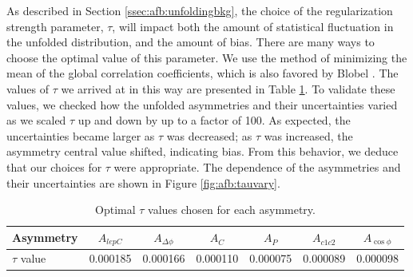 As described in Section \ref{ssec:afb:unfoldingbkg}, the choice of the
regularization strength parameter, $\tau$, will impact both the amount of statistical
fluctuation in the unfolded distribution, and the amount of
bias. There are many ways to choose the optimal value of this parameter. We
use the method of minimizing the mean of the global correlation
coefficients, which is also favored by Blobel
\cite{blobelseminar}. The values of $\tau$ we arrived at in this way
are presented in Table \ref{tab:afb:tau1d}. To validate these values,
we checked how the unfolded asymmetries and their uncertainties varied as we scaled
$\tau$ up and down by up to a factor of 100. As expected, the
uncertainties became larger as $\tau$ was decreased; as $\tau$ was
increased, the asymmetry central value shifted, indicating bias. From
this behavior, we deduce that our choices for $\tau$ were
appropriate. The dependence of the asymmetries and their uncertainties
are shown in Figure \ref{fig:afb:tauvary}.

\begin{table}[htb]
\begin{center}
\caption{Optimal $\tau$ values chosen for each asymmetry.}
\label{tab:afb:tau1d}
\begin{tabular}{l | c  c  c  c  c  c }
\hline
Asymmetry & $A_{lepC}$ & $A_{\Delta\phi}$ & $A_{C}$ & $A_{P}$ & $A_{c1c2}$ & $A_{\cos\phi}$ \\ \hline
$\tau$ value & 0.000185 & 0.000166 & 0.000110 & 0.000075 & 0.000089 & 0.000098 \\ \hline
\end{tabular}
\end{center}
\end{table}

